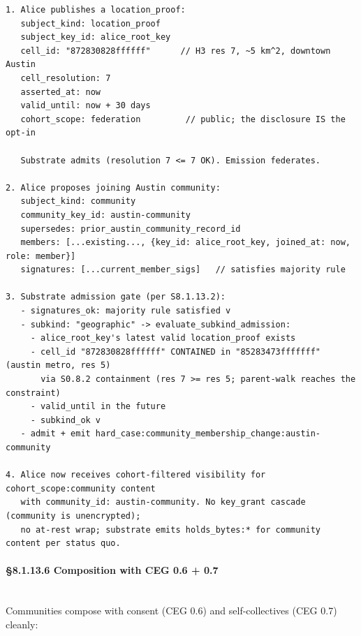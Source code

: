 \documentclass[11pt]{article}
\begin{document}
\begin{lstlisting}
1. Alice publishes a location_proof:
   subject_kind: location_proof
   subject_key_id: alice_root_key
   cell_id: "872830828ffffff"      // H3 res 7, ~5 km^2, downtown Austin
   cell_resolution: 7
   asserted_at: now
   valid_until: now + 30 days
   cohort_scope: federation         // public; the disclosure IS the opt-in

   Substrate admits (resolution 7 <= 7 OK). Emission federates.

2. Alice proposes joining Austin community:
   subject_kind: community
   community_key_id: austin-community
   supersedes: prior_austin_community_record_id
   members: [...existing..., {key_id: alice_root_key, joined_at: now, role: member}]
   signatures: [...current_member_sigs]   // satisfies majority rule

3. Substrate admission gate (per S8.1.13.2):
   - signatures_ok: majority rule satisfied v
   - subkind: "geographic" -> evaluate_subkind_admission:
     - alice_root_key's latest valid location_proof exists
     - cell_id "872830828ffffff" CONTAINED in "85283473fffffff" (austin metro, res 5)
       via S0.8.2 containment (res 7 >= res 5; parent-walk reaches the constraint)
     - valid_until in the future
     - subkind_ok v
   - admit + emit hard_case:community_membership_change:austin-community

4. Alice now receives cohort-filtered visibility for cohort_scope:community content
   with community_id: austin-community. No key_grant cascade (community is unencrypted);
   no at-rest wrap; substrate emits holds_bytes:* for community content per status quo.
\end{lstlisting}

\paragraph{§8.1.13.6 Composition with CEG 0.6 + 0.7}\mbox{}\\


Communities compose with consent (CEG 0.6) and self-collectives (CEG 0.7) cleanly:
\end{document}
